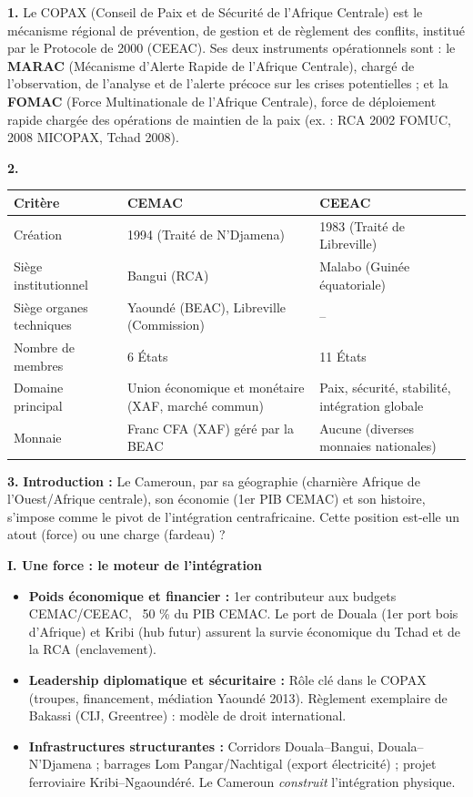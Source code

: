 \documentclass[11pt]{article}
\newcommand{\cle}[1]{{\popxbold\color{popdark}#1}}
\begin{document}
\begin{corrige}
\textbf{1.} Le COPAX (Conseil de Paix et de Sécurité de l'Afrique Centrale) est le mécanisme régional de prévention, de gestion et de règlement des conflits, institué par le Protocole de 2000 (CEEAC). Ses deux instruments opérationnels sont : le \textbf{MARAC} (Mécanisme d'Alerte Rapide de l'Afrique Centrale), chargé de l'observation, de l'analyse et de l'alerte précoce sur les crises potentielles ; et la \textbf{FOMAC} (Force Multinationale de l'Afrique Centrale), force de déploiement rapide chargée des opérations de maintien de la paix (ex. : RCA 2002 FOMUC, 2008 MICOPAX, Tchad 2008).

\textbf{2.}
\begin{center}
\begin{tabularx}{\linewidth}{|l|X|X|}\hline
\rowcolor{popblueL} \textbf{Critère} & \textbf{CEMAC} & \textbf{CEEAC} \\ \hline
Création & 1994 (Traité de N'Djamena) & 1983 (Traité de Libreville) \\ \hline
Siège institutionnel & Bangui (RCA) & Malabo (Guinée équatoriale) \\ \hline
Siège organes techniques & Yaoundé (BEAC), Libreville (Commission) & -- \\ \hline
Nombre de membres & 6 États & 11 États \\ \hline
Domaine principal & Union économique et monétaire (XAF, marché commun) & Paix, sécurité, stabilité, intégration globale \\ \hline
Monnaie & Franc CFA (XAF) géré par la BEAC & Aucune (diverses monnaies nationales) \\ \hline
\end{tabularx}
\end{center}

\textbf{3.} \textbf{Introduction :} Le Cameroun, par sa géographie (charnière Afrique de l'Ouest/Afrique centrale), son économie (1er PIB CEMAC) et son histoire, s'impose comme le \cle{pivot} de l'intégration centrafricaine. Cette position est-elle un atout (force) ou une charge (fardeau) ?

\textbf{I. Une force : le moteur de l'intégration}
\begin{itemize}
\item \textbf{Poids économique et financier :} 1er contributeur aux budgets CEMAC/CEEAC, ~50 \% du PIB CEMAC. Le port de Douala (1er port bois d'Afrique) et Kribi (hub futur) assurent la survie économique du Tchad et de la RCA (enclavement).
\item \textbf{Leadership diplomatique et sécuritaire :} Rôle clé dans le COPAX (troupes, financement, médiation Yaoundé 2013). Règlement exemplaire de Bakassi (CIJ, Greentree) : modèle de droit international.
\item \textbf{Infrastructures structurantes :} Corridors Douala--Bangui, Douala--N'Djamena ; barrages Lom Pangar/Nachtigal (export électricité) ; projet ferroviaire Kribi--Ngaoundéré. Le Cameroun \emph{construit} l'intégration physique.
\end{itemize}


\end{corrige}
\end{document}
